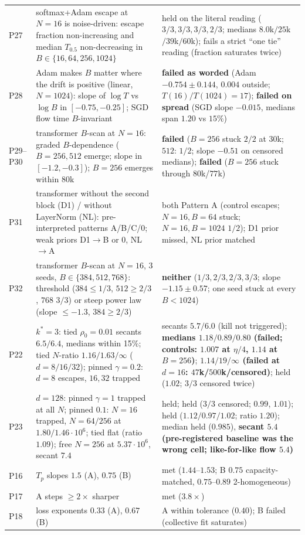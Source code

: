 \begin{center}
\begin{tabular}{lp{6.4cm}p{6.4cm}}
P27 & softmax+Adam escape at $N{=}16$ is noise-driven: escape fraction non-increasing and median $T_{0.5}$ non-decreasing in $B\in\{16,64,256,1024\}$ & held on the literal reading ($3/3,3/3,3/3,2/3$; medians $8.0$k$/25$k$/39$k$/60$k); fails a strict ``one tie'' reading (fraction saturates twice) \\
P28 & Adam makes $B$ matter where the drift is positive (linear, $N{=}1024$): slope of $\log T$ vs $\log B$ in $[-0.75,-0.25]$; SGD flow time $B$-invariant & \textbf{failed as worded} (Adam $-0.754\pm0.144$, $0.004$ outside; $T(16)/T(1024)=17$); \textbf{failed on spread} (SGD slope $-0.015$, medians span $1.20$ vs $15\%$) \\
P29--P30 & transformer $B$-scan at $N{=}16$: graded $B$-dependence ($B{=}256,512$ emerge; slope in $[-1.2,-0.3]$); $B{=}256$ emerges within $80$k & \textbf{failed} ($B{=}256$ stuck $2/2$ at $30$k; $512$: $1/2$; slope $-0.51$ on censored medians); \textbf{failed} ($B{=}256$ stuck through $80$k/$77$k) \\
P31 & transformer without the second block (D1) / without LayerNorm (NL): pre-interpreted patterns A/B/C/0; weak priors D1$\to$B or 0, NL$\to$A & both Pattern A (control escapes; $N{=}16,B{=}64$ stuck; $N{=}16,B{=}1024$ $1/2$); D1 prior missed, NL prior matched \\
P32 & transformer $B$-scan at $N{=}16$, 3 seeds, $B\in\{384,512,768\}$: threshold ($384\le1/3$, $512\ge2/3$, $768$ $3/3$) or steep power law (slope $\le-1.3$, $384\ge2/3$) & \textbf{neither} ($1/3,2/3,2/3,3/3$; slope $-1.15\pm0.57$; one seed stuck at every $B<1024$) \\
P22 & $k^*{=}3$: tied $\rho_0{=}0.01$ secants $6.5/6.4$, medians within 15\%; tied $N$-ratio $1.16/1.63/\infty$ ($d{=}8/16/32$); pinned $\gamma{=}0.2$: $d{=}8$ escapes, $16,32$ trapped & secants $5.7/6.0$ (kill not triggered); \textbf{medians $1.18/0.89/0.80$ (failed; controls: $1.007$ at $\eta/4$, $1.14$ at $B{=}256$)}; \textbf{$1.14/19/\infty$ (failed at $d{=}16$: $47$k/$500$k/censored)}; held ($1.02$; $3/3$ censored twice) \\
P23 & $d{=}128$: pinned $\gamma{=}1$ trapped at all $N$; pinned $0.1$: $N{=}16$ trapped, $N{=}64/256$ at $1.80/1.46\cdot10^6$; tied flat (ratio $1.09$); free $N{=}256$ at $5.37\cdot10^6$, secant $7.4$ & held; held ($3/3$ censored; $0.99$, $1.01$); held ($1.12/0.97/1.02$; ratio $1.20$); median held ($0.985$), \textbf{secant $5.4$ (pre-registered baseline was the wrong cell; like-for-like flow $5.4$)} \\
P16 & $T_p$ slopes $1.5$ (A), $0.75$ (B) & met ($1.44$--$1.53$; B $0.75$ capacity-matched, $0.75$--$0.89$ 2-homogeneous) \\
P17 & A steps $\ge2\times$ sharper & met ($3.8\times$) \\
P18 & loss exponents $0.33$ (A), $0.67$ (B) & A within tolerance ($0.40$); B failed (collective fit saturates) \\
\bottomrule
\end{tabular}
\end{center}
